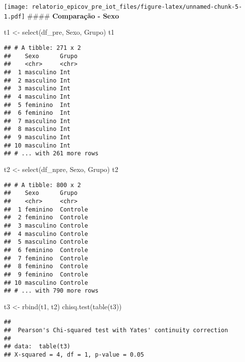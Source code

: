 \documentclass[
]{article}
\newenvironment{Shaded}{\begin{snugshade}}{\end{snugshade}}
\newcommand{\FunctionTok}[1]{\textcolor[rgb]{0.00,0.00,0.00}{#1}}
\newcommand{\NormalTok}[1]{#1}
\newcommand{\OtherTok}[1]{\textcolor[rgb]{0.56,0.35,0.01}{#1}}
\begin{document}
\texttt{[image: relatorio\_epicov\_pre\_iot\_files/figure-latex/unnamed-chunk-5-1.pdf]}
\#\#\#\# \textbf{Comparação - Sexo}

\begin{Shaded}
\begin{Highlighting}[]
\NormalTok{t1 }\OtherTok{\textless{}{-}} \FunctionTok{select}\NormalTok{(df\_pre, Sexo, Grupo)}
\NormalTok{t1}
\end{Highlighting}
\end{Shaded}

\begin{verbatim}
## # A tibble: 271 x 2
##    Sexo      Grupo
##    <chr>     <chr>
##  1 masculino Int  
##  2 masculino Int  
##  3 masculino Int  
##  4 masculino Int  
##  5 feminino  Int  
##  6 feminino  Int  
##  7 masculino Int  
##  8 masculino Int  
##  9 masculino Int  
## 10 masculino Int  
## # ... with 261 more rows
\end{verbatim}

\begin{Shaded}
\begin{Highlighting}[]
\NormalTok{t2 }\OtherTok{\textless{}{-}} \FunctionTok{select}\NormalTok{(df\_npre, Sexo, Grupo)}
\NormalTok{t2}
\end{Highlighting}
\end{Shaded}

\begin{verbatim}
## # A tibble: 800 x 2
##    Sexo      Grupo   
##    <chr>     <chr>   
##  1 feminino  Controle
##  2 feminino  Controle
##  3 masculino Controle
##  4 masculino Controle
##  5 masculino Controle
##  6 feminino  Controle
##  7 feminino  Controle
##  8 feminino  Controle
##  9 feminino  Controle
## 10 masculino Controle
## # ... with 790 more rows
\end{verbatim}

\begin{Shaded}
\begin{Highlighting}[]
\NormalTok{t3 }\OtherTok{\textless{}{-}} \FunctionTok{rbind}\NormalTok{(t1, t2)}
\FunctionTok{chisq.test}\NormalTok{(}\FunctionTok{table}\NormalTok{(t3))}
\end{Highlighting}
\end{Shaded}

\begin{verbatim}
## 
##  Pearson's Chi-squared test with Yates' continuity correction
## 
## data:  table(t3)
## X-squared = 4, df = 1, p-value = 0.05
\end{verbatim}
\end{document}
